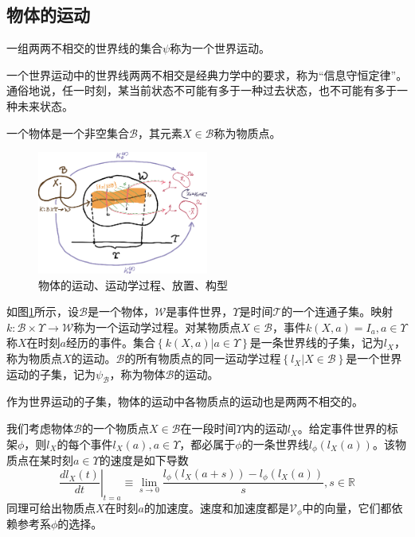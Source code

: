 \documentclass[main.tex]{subfiles}
\begin{document}
\subsection{物体的运动}
\begin{definition}[世界运动]
一组两两不相交的世界线的集合$\psi$称为一个世界运动。
\end{definition}

一个世界运动中的世界线两两不相交是经典力学中的要求，称为“信息守恒定律”。通俗地说，任一时刻，某当前状态不可能有多于一种过去状态，也不可能有多于一种未来状态。

\begin{definition}[物体]
一个物体是一个非空集合$\mathcal{B}$，其元素$X\in\mathcal{B}$称为物质点。
\end{definition}

\begin{figure}[h]
\centering
\includegraphics[width=0.5\textwidth]{images/III.2.1.eps}
\caption{物体的运动、运动学过程、放置、构型}
\label{fig:III.2.1}
\end{figure}

\begin{definition}
如图\ref{fig:III.2.1}所示，设$\mathcal{B}$是一个物体，$\mathcal{W}$是事件世界，$\Upsilon$是时间$\mathcal{T}$的一个连通子集。映射$k:\mathcal{B}\times\Upsilon\rightarrow\mathcal{W}$称为一个运动学过程。对某物质点$X\in\mathcal{B}$，事件$k\left(X,a\right)=I_a,a\in\Upsilon$称$X$在时刻$a$经历的事件。集合$\left\{k\left(X,a\right)|a\in\Upsilon\right\}$是一条世界线的子集，记为$l_X$，称为物质点$X$的运动。$\mathcal{B}$的所有物质点的同一运动学过程$\left\{l_X|X\in\mathcal{B}\right\}$是一个世界运动的子集，记为$\psi_\mathcal{B}$，称为物体$\mathcal{B}$的运动。
\end{definition}

作为世界运动的子集，物体的运动中各物质点的运动也是两两不相交的。

我们考虑物体$\mathcal{B}$的一个物质点$X\in\mathcal{B}$在一段时间$\Upsilon$内的运动$l_X$。给定事件世界的标架$\phi$，则$l_X$的每个事件$l_X\left(a\right),a\in\Upsilon$，都必属于$\phi$的一条世界线$l_\phi\left(l_X\left(a\right)\right)$。该物质点在某时刻$a\in\Upsilon$的速度是如下导数
\[\left.\frac{d l_X\left(t\right)}{dt}\right|_{t=a}\equiv\lim_{s\to 0}\frac{l_\phi\left(l_X\left(a+s\right)\right)-l_\phi\left(l_X\left(a\right)\right)}{s},s\in\mathbb{R}
\]
同理可给出物质点$X$在时刻$a$的加速度。速度和加速度都是$\mathcal{V}_\phi$中的向量，它们都依赖参考系$\phi$的选择。
\end{document}
